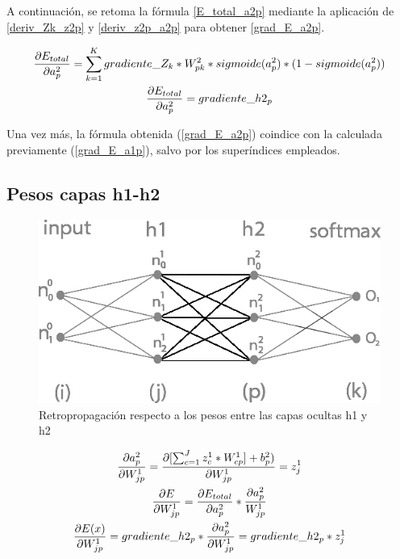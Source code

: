 A continuación, se retoma la fórmula \ref{E_total_a2p} mediante la aplicación de \ref{deriv_Zk_z2p} y \ref{deriv_z2p_a2p} para obtener \ref{grad_E_a2p}.

\begin{gather}
	\frac{\partial E_{total}}{\partial a^2_p} = \sum_{k=1}^K  gradiente\_Z_k * W^2_{pk} * sigmoide(a^2_p)*(1-sigmoide(a^2_p)) \label{grad_E_a2p} \\
	\frac{\partial E_{total}}{\partial a^2_p} = gradiente\_h2_p \notag
\end{gather}

Una vez más, la fórmula obtenida (\ref{grad_E_a2p}) coindice con la calculada previamente (\ref{grad_E_a1p}), salvo por los superíndices empleados. \\

\subsection{Pesos capas h1-h2}

\begin{figure}[H]
	\centering
	\includegraphics[scale=0.35]{imagenes/nn_2_capa_pesos_h1_h2.jpg}  
	\caption{Retropropagación respecto a los pesos entre las capas ocultas h1 y h2}
	\label{fig:nn_2_pesos_h1_h2}
\end{figure}


\begin{gather}
	\frac{\partial a^2_p }{\partial W^1_{jp} } = \frac{\partial [\sum_{c=1}^{J} z^1_c * W^1_{cp}] + b^2_p)}{\partial W^1_{jp} } = z^1_j \notag \\
	\frac{\partial E}{\partial W^1_{jp}} = \frac{\partial E_{total} }{\partial a^2_p } * \frac{\partial a^2_p}{W^1_{jp}} \notag \\
	\frac{\partial E(x) }{\partial W^1_{jp} } = gradiente\_h2_p * \frac{\partial a^2_p }{\partial W^1_{jp} } = gradiente\_h2_p * z^1_j 
	\label{grad_w1jp}
\end{gather}


